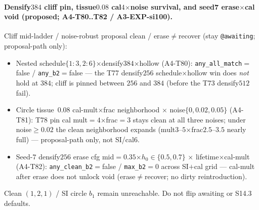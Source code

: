 \documentclass[11pt]{article}
\begin{document}
\paragraph{Densify$384$ cliff pin, tissue$0.08$ cal$4$$\times$noise
survival, and seed7 erase$\times$cal void (proposed; A4-T80..T82 /
A3-EXP-si100).}
Cliff mid-ladder / noise-robust proposal clean / erase$\neq$recover
(stay \texttt{@awaiting}; proposal-path only):
\begin{itemize}[leftmargin=1.5em]
  \item Nested schedule$\{1{:}3,2{:}6\}$$\times$densify$384$$\times$hollow
  (A4-T80): \texttt{any\_all\_match}${=}$false /
  \texttt{any\_b2}${=}$false --- the T77 densify$256$ schedule$\times$hollow
  win does \emph{not} hold at $384$; cliff is pinned between $256$ and
  $384$ (before the T73 densify$512$ fail).
  \item Circle tissue~$0.08$ cal-mult$\times$frac neighborhood $\times$
  noise$\{0,0.02,0.05\}$ (A4-T81): T78 pin cal mult${=}4$$\times$frac${=}3$
  stays clean at all three noises; under noise$\ge 0.02$ the clean
  neighborhood expands (mult$3$--$5$$\times$frac$2.5$--$3.5$ nearly full)
  --- proposal-path only, not SI/cal$6$.
  \item Seed-$7$ densify$256$ erase cfg mid${=}0.35$$\times h_0\in\{0.5,0.7\}$
  $\times$ lifetime$\times$cal-mult (A4-T82): \texttt{any\_clean\_b2}${=}$false
  / \texttt{max\_b2}${=}0$ across SI$+$cal grid --- cal-mult after erase
  does not unlock void (erase$\neq$recover; no dirty reintroduction).
\end{itemize}
Clean $(1,2,1)$ / SI circle $b_1$ remain unreachable. Do not flip
awaiting or S14.3 defaults.
\end{document}
